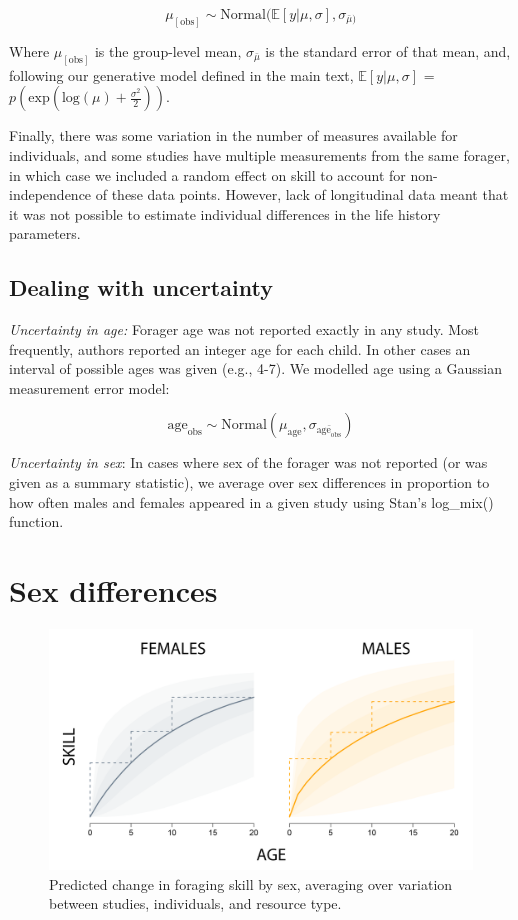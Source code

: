 $$ \mu_{[\textrm{obs}]} \sim \textrm{Normal}(\mathbb{E}[y|\mu,\sigma], \sigma_{\bar{\mu})} $$

Where $\mu_{[\textrm{obs}]}$ is the group-level mean, $\sigma_{\bar{\mu}}$ is the standard error of that mean, and, following our generative model defined in the main text, $\mathbb{E}[y|\mu,\sigma]$ = $p(\textrm{exp}( \textrm{log}(\mu) + \frac{\sigma^2}{2})) $.

Finally, there was some variation in the number of measures available for individuals, and some studies have multiple measurements from the same forager, in which case we included a random effect on skill to account for non-independence of these data points. However, lack of longitudinal data meant that it was not possible to estimate individual differences in the life history parameters.


\subsection{Dealing with uncertainty }

\emph{Uncertainty in age:} Forager age was not reported exactly in any study. Most frequently, authors reported an integer age for each child. In other cases an interval of possible ages was given (e.g., 4-7). We modelled age using a Gaussian measurement error model:

$$ \textrm{age}_{\textrm{obs}} \sim \textrm{Normal}(\mu_{\textrm{age}}, \sigma_{\bar{\textrm{age}_{\textrm{obs}}}}) $$

\emph{Uncertainty in sex}: In cases where sex of the forager was not reported (or was given as a summary statistic), we average over sex differences in proportion to how often males and females appeared in a given study using Stan's log\_mix() function.

\section{Sex differences}\label{SI:sex_diff}


\begin{figure}[h]
\centering
\includegraphics[width=12cm] {text/images/sex_diffs.png}
\caption{ Predicted change in foraging skill by sex, averaging over variation between studies, individuals, and resource type.}
\label{fig:sex_diffs}
\end{figure}
